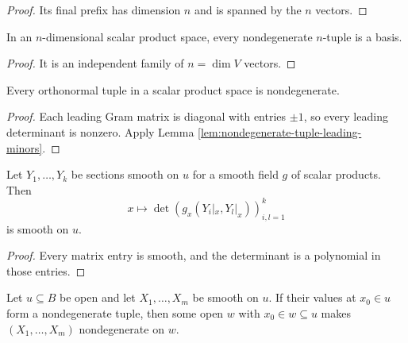 \begin{proof}
\leanok
\sketch Its final prefix has dimension $n$ and is spanned by the $n$ vectors.
\end{proof}

\begin{lemma}
\label{lem:nondegenerate-tuple-basis}
\leanok
{}
In an $n$-dimensional scalar product space, every nondegenerate $n$-tuple is a
basis.
\end{lemma}

\begin{proof}
\leanok
{}
\sketch It is an independent family of $n=\dim V$ vectors.
\end{proof}

\begin{lemma}
\label{lem:orthonormal-tuple-nondegenerate}
\leanok
{}
Every orthonormal tuple in a scalar product space is nondegenerate.
\end{lemma}

\begin{proof}
\leanok
{}
\sketch Each leading Gram matrix is diagonal with entries $\pm1$, so every
leading determinant is nonzero. Apply Lemma
\ref{lem:nondegenerate-tuple-leading-minors}.
\end{proof}

\begin{lemma}
\label{lem:gram-det-smooth}
\leanok
{}
Let $Y_1,\ldots,Y_k$ be sections smooth on $u$ for a smooth field $g$ of scalar
products. Then
\[
x\longmapsto\det(g_x(Y_i|_x,Y_l|_x))_{i,l=1}^k
\]
is smooth on $u$.
\end{lemma}

\begin{proof}
\leanok
{}
\sketch Every matrix entry is smooth, and the determinant is a polynomial in
those entries.
\end{proof}

\begin{lemma}
\label{lem:open-nondegenerate-tuple}
\leanok
{}
Let $u\subseteq B$ be open and let $X_1,\ldots,X_m$ be smooth on $u$. If their
values at $x_0\in u$ form a nondegenerate tuple, then some open
$w$ with $x_0\in w\subseteq u$ makes $(X_1,\ldots,X_m)$ nondegenerate on $w$.
\end{lemma}

